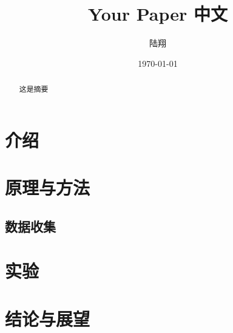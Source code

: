 \documentclass{article}
\title{Your Paper 中文}
\author{陆翔}
\date{\today}
\begin{document}
\maketitle

\begin{abstract}
    这是摘要
\end{abstract}

\newpage
\begin{center}
    \tableofcontents
\end{center}

\newpage
\section{介绍}


\section{原理与方法}
\subsection{数据收集}





\newpage
\section{实验}

\section{结论与展望}
\end{document}

